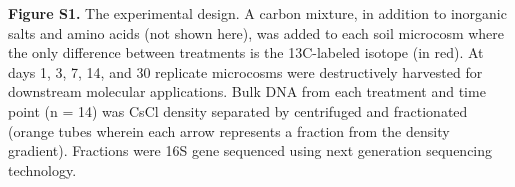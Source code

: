 \textbf{Figure S1.} The experimental design.  A carbon mixture, in addition to inorganic salts and amino acids (not shown here), was added to each soil microcosm where the only difference between treatments is the 13C-labeled isotope (in red). At days 1, 3, 7, 14, and 30 replicate microcosms were destructively harvested for downstream molecular applications. Bulk DNA from each treatment and time point (n = 14) was CsCl density separated by centrifuged and fractionated (orange tubes wherein each arrow represents a fraction from the density gradient). Fractions were 16S gene sequenced using next generation sequencing technology.